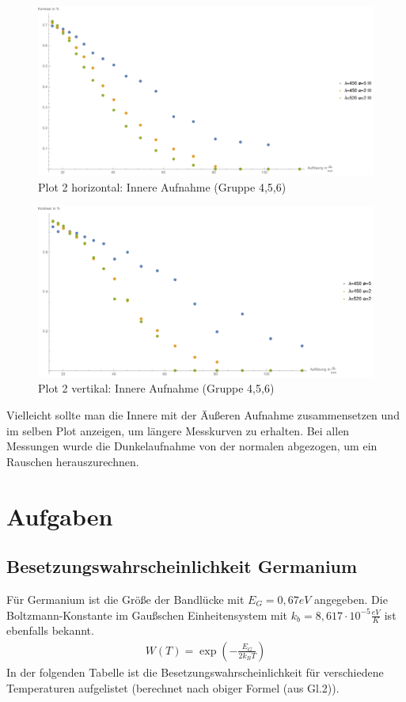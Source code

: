 \begin{figure}[H]
	\centering
\includegraphics[width=0.9\linewidth]{IMAGE/Versuch2Plot2horizontal2.pdf}
	\caption{Plot 2 horizontal: Innere Aufnahme (Gruppe 4,5,6)}
	\label{fig:Versuch2_Plot2h}
\end{figure} 

\begin{figure}[H]
	\centering
\includegraphics[width=0.9\linewidth]{IMAGE/Versuch2Plot2vertikal2.pdf}
	\caption{Plot 2 vertikal: Innere Aufnahme (Gruppe 4,5,6)}
	\label{fig:Versuch2_Plot2v}
\end{figure} 

Vielleicht sollte man die Innere mit der Äußeren Aufnahme zusammensetzen und im selben Plot anzeigen, um längere Messkurven zu erhalten.
Bei allen Messungen wurde die Dunkelaufnahme von der normalen abgezogen, um ein Rauschen herauszurechnen.
\section{Aufgaben}
\subsection{Besetzungswahrscheinlichkeit Germanium}
Für Germanium ist die Größe der Bandlücke mit \(E_G=0,67\si{eV}\) angegeben. Die Boltzmann-Konstante im Gaußschen Einheitensystem mit \(k_b=8,617\cdot 10^{-5}\si{\frac{eV}{K}}\) ist ebenfalls bekannt. 
\begin{align*}
W(T) = \exp\left(-\frac{E_G}{2 k_B T}\right)
\end{align*}
In der folgenden Tabelle ist die Besetzungswahrscheinlichkeit für verschiedene Temperaturen aufgelistet (berechnet nach obiger Formel (aus Gl.2)).

